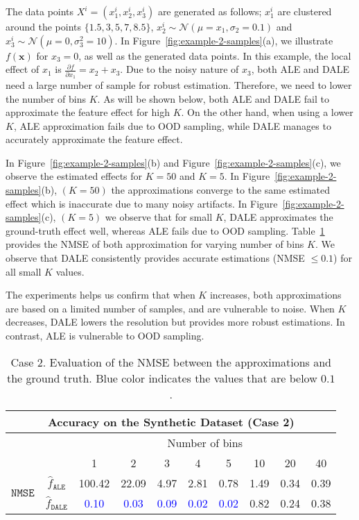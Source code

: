 \documentclass[wcp]{jmlr}
\newcommand{\dale}{\hat{f}_{\mathtt{DALE}}}
\newcommand{\alep}{\hat{f}_{\mathtt{ALE}}}
\newcommand{\xb}{\mathbf{x}}
\begin{document}
\noindent
%
The data points \(X^i = (x_1^i, x_2^i, x_3^i)\) are generated as follows; \(x_1^i \) are clustered around the points \(\{1.5, 3, 5, 7, 8.5\}\), \(x_2^i \sim \mathcal{N}(\mu=x_1, \sigma_2=0.1) \) and \(x_3^i \sim \mathcal{N}(\mu=0, \sigma_3^2=10) \). In Figure~\ref{fig:example-2-samples}(a), we illustrate \(f(\xb)\) for \(x_3=0\), as well as the generated data points. In this example, the local effect of \(x_1\) is \(\frac{\partial f}{\partial x_1} = x_2 + x_3\). Due to the noisy nature of \(x_3\), both ALE and DALE need a large number of sample for robust estimation. Therefore, we need to lower the number of bins \(K\). As will be shown below, both ALE and DALE fail to approximate the feature effect for high \(K\). On the other hand, when using a lower \(K\), ALE approximation fails due to OOD sampling, while DALE manages to accurately approximate the feature effect.

In Figure~\ref{fig:example-2-samples}(b) and Figure~\ref{fig:example-2-samples}(c), we observe the estimated effects for \(K=50\) and \(K=5\). In Figure~\ref{fig:example-2-samples}(b), \((K=50)\) the approximations converge to the same estimated effect which is inaccurate due to many noisy artifacts. In Figure~\ref{fig:example-2-samples}(c), \((K=5)\) we observe that for small \(K\), DALE approximates the ground-truth effect well, whereas ALE fails due to OOD sampling. Table~\ref{tab:case-2-accuracy} provides the NMSE of both approximation for varying number of bins \(K\). We observe that DALE consistently provides accurate estimations (NMSE \(\leq 0.1\)) for all small \(K\) values.

The experiments helps us confirm that when \(K \) increases, both approximations are based on a limited number of samples, and are vulnerable to noise. When \(K\) decreases, DALE lowers the resolution but provides more robust estimations. In contrast, ALE is vulnerable to OOD sampling.

\begin{table} \centering
  \caption{Case 2. Evaluation of the NMSE between the approximations and the ground truth. Blue color indicates the values that are below \(0.1\).}
  \label{tab:case-2-accuracy}
  \begin{tabular}{c|c|c|c|c|c|c|c|c|c}
    \multicolumn{10}{c}{Accuracy on the Synthetic Dataset (Case 2)} \\
    \hline \hline & & \multicolumn{8}{|c}{Number of bins} \\
    \hline & & 1 & 2 & 3 & 4 & 5 & 10 & 20 & 40 \\
    \hline \hline \multirow{2}{*}{\(\mathtt{NMSE}\)} & \(\alep\) & 100.42 & 22.09 & 4.97 & 2.81 & 0.78 & 1.49 & 0.34 & 0.39 \\
    & \(\dale\) & \textcolor{blue}{0.10} & \textcolor{blue}{0.03} & \textcolor{blue}{0.09} & \textcolor{blue}{0.02} & \textcolor{blue}{0.02} & 0.82 & 0.24 & 0.38 \\
    \hline
  \end{tabular}
\end{table}
\end{document}
